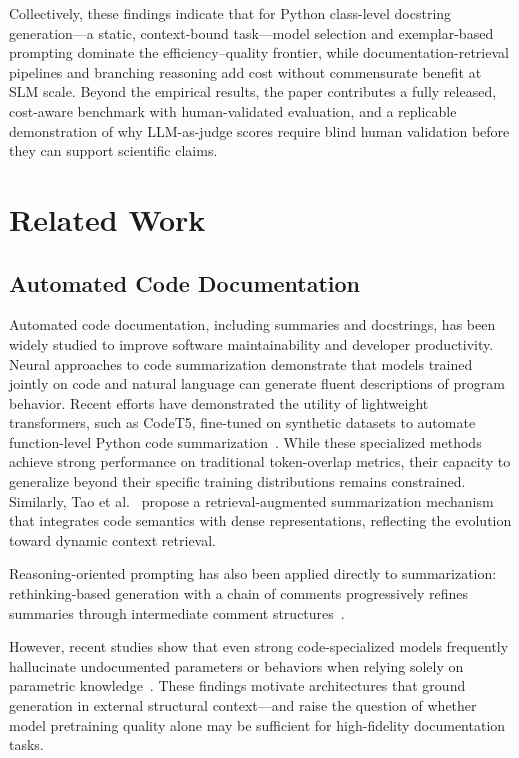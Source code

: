 \documentclass[pdflatex,sn-mathphys-ay]{sn-jnl}%
\theoremstyle{thmstyleone}%
\theoremstyle{thmstyletwo}%
\theoremstyle{thmstylethree}%
\begin{document}
{Collectively, these findings indicate that for Python class-level docstring generation---a static, context-bound task---model selection and exemplar-based prompting dominate the efficiency--quality frontier, while documentation-retrieval pipelines and branching reasoning add cost without commensurate benefit at SLM scale. Beyond the empirical results, the paper contributes a fully released, cost-aware benchmark with human-validated evaluation, and a replicable demonstration of why LLM-as-judge scores require blind human validation before they can support scientific claims.


}
\section{Related Work}
\label{sec:related}

\subsection{Automated Code Documentation}
Automated code documentation, including summaries and docstrings, has been widely studied to improve software maintainability and developer productivity. Neural approaches to code summarization demonstrate that models trained jointly on code and natural language can generate fluent descriptions of program behavior. Recent efforts have demonstrated the utility of lightweight transformers, such as CodeT5, fine-tuned on synthetic datasets to automate function-level Python code summarization~\cite{Kharidu2025AutomatedFL}. While these specialized methods achieve strong performance on traditional token-overlap metrics, their capacity to generalize beyond their specific training distributions remains constrained. Similarly, Tao et al.~\cite{Tao2025RetrievalAugmentedCG} propose a retrieval-augmented summarization mechanism that integrates code semantics with dense representations, reflecting the evolution toward dynamic context retrieval. {\color{blue}
Reasoning-oriented prompting has also been applied directly to summarization: rethinking-based generation with a chain of comments progressively refines summaries through intermediate comment structures~\cite{chainofcomments2025}.

}
However, recent studies show that even strong code-specialized models frequently hallucinate undocumented parameters or behaviors when relying solely on parametric knowledge~\cite{CanDR,gireesh}. These findings motivate architectures that ground generation in external structural context---and raise the question of whether model pretraining quality alone may be sufficient for high-fidelity documentation tasks.
\end{document}
